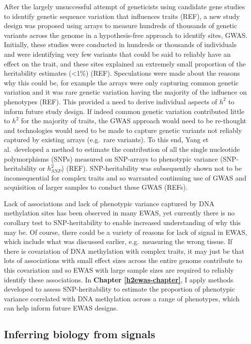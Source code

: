 \documentclass[11pt,twoside]{bristolthesis}
\begin{document}
After the largely unsuccessful attempt of geneticists using candidate gene studies to identify genetic sequence variation that influences traits (REF), a new study design was proposed using arrays to measure hundreds of thousands of genetic variants across the genome in a hypothesis-free approach to identify sites, GWAS. Initially, these studies were conducted in hundreds or thousands of individuals and were identifying very few variants that could be said to reliably have an effect on the trait, and these sites explained an extremely small proportion of the heritability estimates (\textless1\%) (REF). Speculations were made about the reasons why this could be, for example the arrays were only capturing common genetic variation and it was rare genetic variation having the majority of the influence on phenotypes (REF). This provided a need to derive individual aspects of \(h^2\) to inform future study design. If indeed common genetic variation contributed little to \(h^2\) for the majority of traits, the GWAS approach would need to be re-thought and technologies would need to be made to capture genetic variants not reliably captured by existing arrays (e.g.~rare variants). To this end, Yang et al.~developed a method to estimate the contribution of all the single nucleotide polymorphisms (SNPs) measured on SNP-arrays to phenotypic variance (SNP-heritability or \(h^2_{SNP}\)) (REF). SNP-heritability was subsequently shown not to be inconsequential for complex traits and so warranted continuing use of GWAS and acquisition of larger samples to conduct these GWAS (REFs).

Lack of associations and lack of phenotypic variance captured by DNA methylation sites has been observed in many EWAS, yet currently there is no corollary test to SNP-heritability to enable increased understanding of why this may be. Of course, there could be a variety of reasons for lack of signal in EWAS, which include what was discussed earlier, e.g.~measuring the wrong tissue. If there is covariation of DNA methylation with complex traits, it may just be that lots of associations with small effect sizes across the entire genome contribute to this covariation and so EWAS with large sample sizes are required to reliably identify these associations. In \textbf{Chapter \ref{h2ewas-chapter}}, I apply methods developed to assess SNP-heritability to estimate the proportion of phenotypic variance correlated with DNA methylation across a range of phenotypes, which can help inform future EWAS designs.

\hypertarget{inferring-biology-from-signals}{%
\subsection{Inferring biology from signals}\label{inferring-biology-from-signals}}
\end{document}
